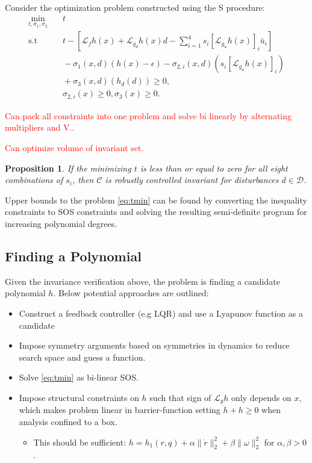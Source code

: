 \documentclass[conference]{IEEEtran}
\newtheorem{prop}{Proposition}
\begin{document}
Consider the optimization problem constructed using the S procedure:
\begin{equation}
\label{eq:tmin}
\begin{aligned}
  \min_{t, \sigma_1, \sigma_2} & \quad t \\
  \text{s.t} &  \quad  t - \left[ \mathcal L_f h(x) + \mathcal L_{g_d} h(x) d -\sum_{i=1}^4 s_i \left[\mathcal L_{g_u} h(x) \right]_i \bar u_i \right] \\
             & \quad - \sigma_1(x,d) \left( h(x) - \epsilon \right) - \sigma_{2,i}(x,d) \left( s_i \left[ \mathcal L_{g_u} h(x) \right]_i \right) \\
             & \quad + \sigma_3(x,d) \left( h_d(d) \right) \geq 0, \\
             & \quad  \sigma_{2,i}(x) \geq 0, \sigma_3(x) \geq 0.
\end{aligned}
\end{equation}

\textcolor{red}{Can pack all constraints into one problem and solve bi linearly by alternating multipliers and V..}

\textcolor{red}{Can optimize volume of invariant set.}

\begin{prop}
  If the minimizing $t$ is less than or equal to zero for all eight combinations of $s_i$, then $\mathcal C$ is robustly controlled invariant for disturbances $d \in \mathcal D$.
\end{prop}

Upper bounds to the problem \eqref{eq:tmin} can be found by converting the inequality constraints to SOS constraints and solving the resulting semi-definite program for increasing polynomial degrees.

\subsection{Finding a Polynomial}

Given the invariance verification above, the problem is finding a candidate polynomial $h$. Below potential approaches are outlined:
\begin{itemize}
   \item Construct a feedback controller (e.g LQR) and use a Lyapunov function as a candidate
   \item Impose symmetry arguments based on symmetries in dynamics to reduce search space and guess a function.
   \item Solve \eqref{eq:tmin} as bi-linear SOS.
   \item Impose structural constraints on $h$ such that sign of $\mathcal L_g h$ only depends on $x$, which makes problem linear in barrier-function setting $\dot h + h \geq 0$ when analysis confined to a box.
   \begin{itemize}
     \item This should be sufficient: $h = h_1(r,q) + \alpha \| \dot r \|^2_2 + \beta \| \omega \|_2^2$ for $\alpha, \beta > 0$.
   \end{itemize} 
\end{itemize} 


\printbibliography 
\end{document}
